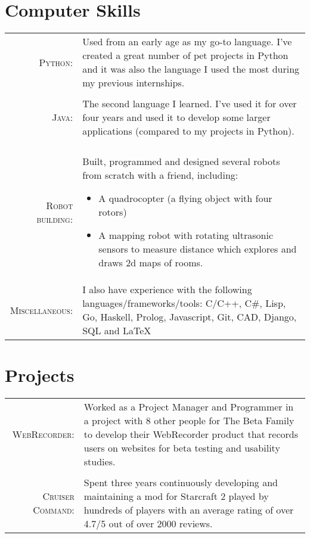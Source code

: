 \documentclass[a4paper,10pt]{article} %
\begin{document}

\section{Computer Skills}

\begin{tabular}{rp{13cm}}

\textsc{Python:} & \small{Used from an early age as my go-to language. I’ve created a great number of pet projects in Python and it was also the language I used the most during my previous internships.}\\\\

\textsc{Java:} & \small{The second language I learned. I’ve used it for over four years and used it to develop some larger applications (compared to my projects in Python).}\\\\

\textsc{Robot building:} & \small{Built, programmed and designed several robots from scratch with a friend, including:
\begin{itemize}
\item A quadrocopter (a flying object with four rotors)
\item A mapping robot with rotating ultrasonic sensors to measure distance which explores and draws 2d maps of rooms.
\end{itemize}}\\

\textsc{Miscellaneous:} & \small{I also have experience with the following languages/frameworks/tools:  C/C++, C\#, Lisp, Go, Haskell, Prolog, Javascript, Git, CAD, Django, SQL and \LaTeX}

\end{tabular}


\section{Projects}

\begin{tabular}{rp{13cm}}
\textsc{WebRecorder:} & \small{Worked as a Project Manager and Programmer in a project with 8 other people for The Beta Family to develop their WebRecorder product that records users on websites for beta testing and usability studies.} \\\\
\textsc{Cruiser Command:} & \small{Spent three years continuously developing and maintaining a mod for Starcraft 2 played by hundreds of players with an average rating of over 4.7/5 out of over 2000 reviews.}
\end{tabular}
\end{document}
